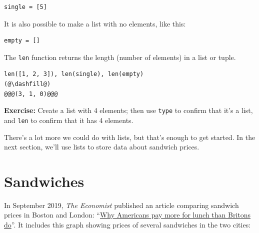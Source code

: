 \begin{lstlisting}[]
single = [5]
\end{lstlisting}

It is also possible to make a list with no elements, like this:

\begin{lstlisting}[]
empty = []
\end{lstlisting}

The \passthrough{\lstinline!len!} function returns the length (number of
elements) in a list or tuple.

\begin{lstlisting}[]
len([1, 2, 3]), len(single), len(empty)
(@\dashfill@)
@@@(3, 1, 0)@@@
\end{lstlisting}

\textbf{Exercise:} Create a list with 4 elements; then use
\passthrough{\lstinline!type!} to confirm that it's a list, and
\passthrough{\lstinline!len!} to confirm that it has 4 elements.

There's a lot more we could do with lists, but that's enough to get
started. In the next section, we'll use lists to store data about
sandwich prices.

\hypertarget{sandwiches}{%
\section{Sandwiches}\label{sandwiches}}

In September 2019, \emph{The Economist} published an article comparing
sandwich prices in Boston and London:
``\href{https://www.economist.com/finance-and-economics/2019/09/07/why-americans-pay-more-for-lunch-than-britons-do}{Why
Americans pay more for lunch than Britons do}''. It includes this graph
showing prices of several sandwiches in the two cities:

